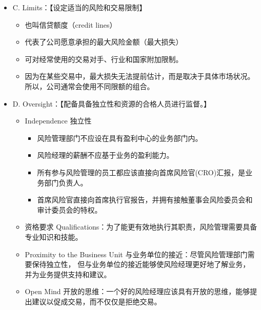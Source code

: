\begin{itemize}
\item C. Limits：【设定适当的风险和交易限制】
    \begin{itemize}
    \item 也叫信贷额度（credit lines）
    \item 代表了公司愿意承担的最大风险金额（最大损失）
    \item 可对经常使用的交易对手、行业和国家附加限制。
    \item 因为在某些交易中，最大损失无法提前估计，而是取决于具体市场状况。所以，公司通常会使用不同限额的组合。
    \end{itemize}

\item D. Oversight：【配备具备独立性和资源的合格人员进行监督。】
    \begin{itemize}
    \item Independence 独立性
        \begin{itemize}
        \item 风险管理部门不应设在具有盈利中心的业务部门内。
        \item 风险经理的薪酬不应基于业务的盈利能力。
        \item 所有参与风险管理的员工都应该直接向首席风险官(CRO)汇报，是业务部门负责人。
        \item 首席风险官直接向首席执行官报告，并拥有接触董事会风险委员会和审计委员会的特权。
        \end{itemize}
    \item 资格要求 Qualifications：为了能更有效地执行其职责，风险管理需要具备专业知识和技能。
    \item Proximity to the Business Unit 与业务单位的接近：尽管风险管理部门需要保待独立性， 但与业务单位的接近能够使风险经理更好地了解业务， 并为业务提供支持和建议。
    \item Open Mind 开放的思维：一个好的风险经理应该具有开放的思维，能够提出建议以促成交易，而不仅仅是拒绝交易。
    \end{itemize}
\end{itemize}




